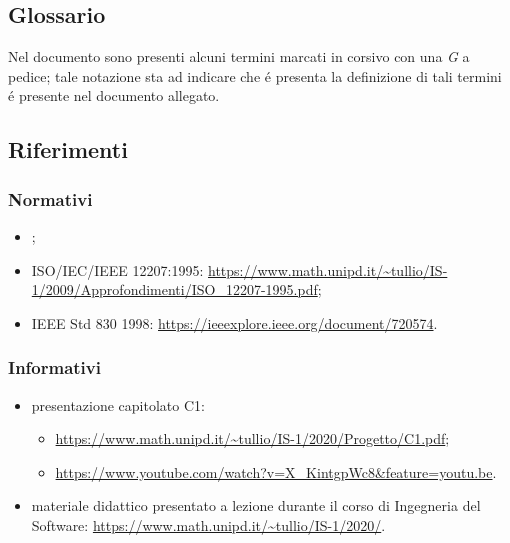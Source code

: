 \subsection{Glossario}
Nel documento sono presenti alcuni termini marcati in corsivo con una \emph{G} a pedice; tale notazione sta ad indicare che \'{e} presenta la definizione di tali termini \'{e} presente nel documento \Gv{} allegato.

\subsection{Riferimenti}

\subsubsection{Normativi}
\begin{itemize}
    \item \textbf{\NdPv};
    \item ISO/IEC/IEEE 12207:1995: \url{https://www.math.unipd.it/~tullio/IS-1/2009/Approfondimenti/ISO_12207-1995.pdf};
    \item IEEE Std 830 1998: \url{https://ieeexplore.ieee.org/document/720574}.
\end{itemize}

\subsubsection{Informativi}
\begin{itemize}
    \item presentazione capitolato C1:
    \begin{itemize} 
        \item \url{https://www.math.unipd.it/~tullio/IS-1/2020/Progetto/C1.pdf};
        \item \url{https://www.youtube.com/watch?v=X_KintgpWc8&feature=youtu.be}.
    \end{itemize}
    \item materiale didattico presentato a lezione durante il corso di Ingegneria del Software: \url{https://www.math.unipd.it/~tullio/IS-1/2020/}.
    
    
\end{itemize}